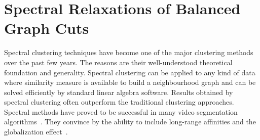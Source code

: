 \chapter{Spectral Relaxations of Balanced Graph Cuts}%
\label{SpectRelax}
Spectral clustering techniques have become one of the major clustering methods over the past few years. 
The reasons are their well-understood theoretical foundation and generality. Spectral clustering can be applied to any kind of data where similarity measure is available
to build a neighbourhood graph and can be solved efficiently by standard linear algebra software. Results obtained by spectral clustering often outperform the traditional clustering approaches.
Spectral methods have proved to be successful in many video segmentation algorithms~\cite{Brox10,GalassoCS12,Galasso14}. They convince by the ability to include long-range affinities and
the globalization effect~\cite{Fowlkes04}.


